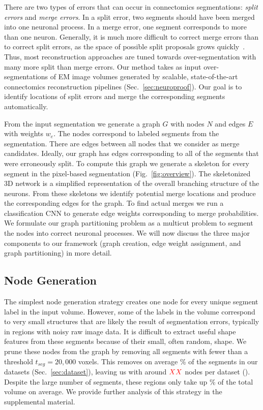 There are two types of errors that can occur in connectomics segmentations: \textit{split errors} and \textit{merge errors}. 
In a split error, two segments should have been merged into one neuronal process. 
In a merge error, one segment corresponds to more than one neuron.
Generally, it is much more difficult to correct merge errors than to correct split errors,
as the space of possible split proposals grows quickly~\cite{parag2015properties}.
Thus, most reconstruction approaches are tuned towards over-segmentation with many more split than merge errors. 
Our method takes as input over-segmentations of EM image volumes generated by scalable, state-of-the-art connectomics reconstruction pipelines (Sec.~\ref{sec:neuroproof}). 
Our goal is to identify locations of split errors and merge the corresponding segments automatically.

From the input segmentation we generate a graph $G$ with nodes $N$ and edges $E$ with weights $w_e$. 
The nodes correspond to labeled segments from the segmentation.
There are edges between all nodes that we consider as merge candidates.
Ideally, our graph has edges corresponding to all of the segments that were erroneously split. 
To compute this graph we generate a skeleton for every segment in the pixel-based segmentation (Fig.~\ref{fig:overview}). 
The skeletonized 3D network is a simplified representation of the overall branching structure of the neurons. 
From these skeletons we identify potential merge locations and produce the corresponding edges for the graph. 
To find actual merges we run a classification CNN to generate edge weights corresponding to merge probabilities.
We formulate our graph partitioning problem as a multicut problem to segment the nodes into correct neuronal processes. 
We will now discuss the three major components to our framework (graph creation, edge weight assignment, and graph partitioning) in more detail.

\subsection{Node Generation}
\label{sec:skeletonization}

The simplest node generation strategy creates one node for every unique segment label in the input volume. 
However, some of the labels in the volume correspond to very small structures that are likely the result of segmentation errors, typically in regions with noisy raw image data. 
It is difficult to extract useful shape features from these segments because of their small, often random, shape. 
We prune these nodes from the graph by removing all segments with fewer than a threshold $t_{seg} = 20,000$ voxels. 
This removes on average \% of the segments in our  datasets (Sec.~\ref{sec:dataset}), leaving us with around $\textcolor{red}{XX}$ nodes per dataset (). 
Despite the large number of segments, these regions only take up \% of the total volume on average.
We provide further analysis of this strategy in the supplemental material. 

